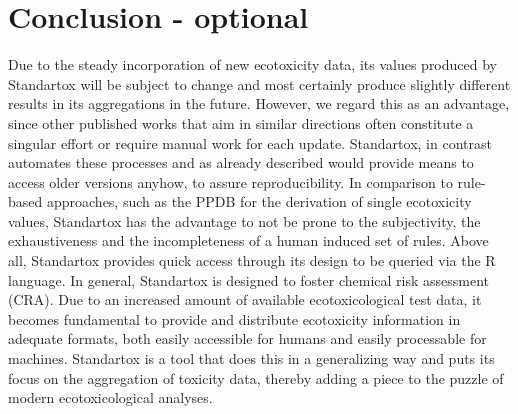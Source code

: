 \documentclass[journal,datadescriptor,accept,moreauthors,pdftex]{Definitions/mdpi}
\begin{document}
\section{Conclusion - optional}
Due to the steady incorporation of new ecotoxicity data, its values produced by Standartox will be subject to change and most certainly produce slightly different results in its aggregations in the future. However, we regard this as an advantage, since other published works that aim in similar directions often constitute a singular effort or require manual work for each update. Standartox, in contrast automates these processes and as already described would provide means to access older versions anyhow, to assure reproducibility. In comparison to rule-based approaches, such as the PPDB for the derivation of single ecotoxicity values, Standartox has the advantage to not be prone to the subjectivity, the exhaustiveness and the incompleteness of a human induced set of rules. Above all, Standartox provides quick access through its design to be queried via the R language. In general, Standartox is designed to foster chemical risk assessment (CRA). Due to an increased amount of available ecotoxicological test data, it becomes fundamental to provide and distribute ecotoxicity information in adequate formats, both easily accessible for humans and easily processable for machines. Standartox is a tool that does this in a generalizing way and puts its focus on the aggregation of toxicity data, thereby adding a piece to the puzzle of modern ecotoxicological analyses.


\vspace{6pt} 



\end{document}

